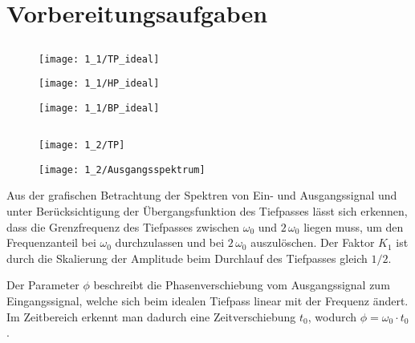 \documentclass[a4paper, 12pt]{article}
\begin{document}
  
  \clearpage
  \setcounter{page}{1}

\section{Vorbereitungsaufgaben}

\subsection{}
\begin{figure}[H]
	\texttt{[image: 1\_1/TP\_ideal]}
\end{figure}

\begin{figure}[H]
	\texttt{[image: 1\_1/HP\_ideal]}
\end{figure}

\begin{figure}[H]
	\texttt{[image: 1\_1/BP\_ideal]}
\end{figure}

\subsection{}

\begin{figure}[H]
	\texttt{[image: 1\_2/TP]}
\end{figure}

\begin{figure}[H]
	\texttt{[image: 1\_2/Ausgangsspektrum]}
\end{figure}


Aus der grafischen Betrachtung der Spektren von Ein- und Ausgangssignal und
unter Berücksichtigung der Übergangsfunktion des Tiefpasses lässt sich erkennen,
dass die Grenzfrequenz des Tiefpasses zwischen $\omega_0$ und $2 \,\omega_0$
liegen muss, um den Frequenzanteil bei $\omega_0$ durchzulassen und bei
$2\,\omega_0$ auszulöschen. Der Faktor $K_1$ ist durch die Skalierung der
Amplitude beim Durchlauf des Tiefpasses gleich $1/2$.

Der Parameter $\phi$ beschreibt die Phasenverschiebung vom Ausgangssignal zum
Eingangssignal, welche sich beim idealen Tiefpass linear mit der Frequenz
ändert. Im Zeitbereich erkennt man dadurch eine Zeitverschiebung $t_0$, wodurch
$\phi = \omega_0 \cdot t_0$.
\end{document}
